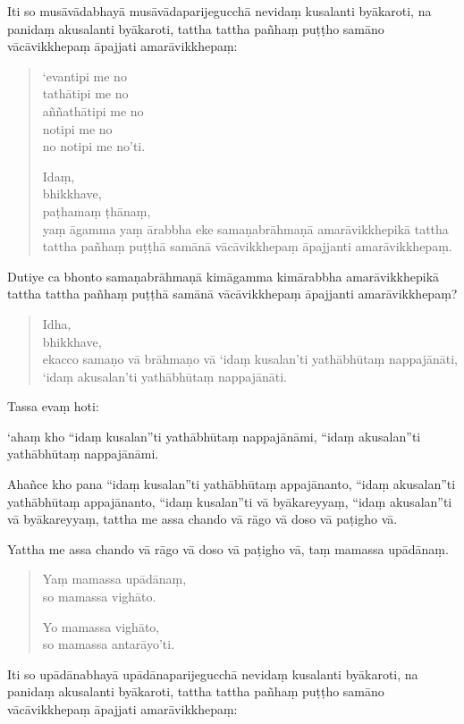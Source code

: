 \documentclass[11pt,twoside,openright]{book}
\begin{document}
\pstart
Iti so musāvādabhayā musāvādaparijegucchā nevidaṃ kusalanti byākaroti, na panidaṃ akusalanti byākaroti, tattha tattha pañhaṃ puṭṭho samāno vācāvikkhepaṃ āpajjati amarāvikkhepaṃ:
\pend

\begin{verse}
‘evantipi me no\\
 tathātipi me no\\
 aññathātipi me no\\
 notipi me no\\
 no notipi me no’ti.

Idaṃ,\\
\vin  bhikkhave,\\
\vin  paṭhamaṃ ṭhānaṃ,\\
\vin  yaṃ āgamma yaṃ ārabbha eke samaṇabrāhmaṇā amarāvikkhepikā tattha tattha pañhaṃ puṭṭhā samānā vācāvikkhepaṃ āpajjanti amarāvikkhepaṃ.

\end{verse}
\pstart
Dutiye ca bhonto samaṇabrāhmaṇā kimāgamma kimārabbha amarāvikkhepikā tattha tattha pañhaṃ puṭṭhā samānā vācāvikkhepaṃ āpajjanti amarāvikkhepaṃ?
\pend

\begin{verse}
Idha,\\
\vin  bhikkhave,\\
\vin  ekacco samaṇo vā brāhmaṇo vā ‘idaṃ kusalan’ti yathābhūtaṃ nappajānāti,\\
\vin  ‘idaṃ akusalan’ti yathābhūtaṃ nappajānāti.

\end{verse}
\pstart
Tassa evaṃ hoti:
\pend

\pstart
‘ahaṃ kho “idaṃ kusalan”ti yathābhūtaṃ nappajānāmi, “idaṃ akusalan”ti yathābhūtaṃ nappajānāmi.
\pend

\pstart
Ahañce kho pana “idaṃ kusalan”ti yathābhūtaṃ appajānanto, “idaṃ akusalan”ti yathābhūtaṃ appajānanto, “idaṃ kusalan”ti vā byākareyyaṃ, “idaṃ akusalan”ti vā byākareyyaṃ, tattha me assa chando vā rāgo vā doso vā paṭigho vā.
\pend

\pstart
Yattha me assa chando vā rāgo vā doso vā paṭigho vā, taṃ mamassa upādānaṃ.
\pend

\begin{verse}
Yaṃ mamassa upādānaṃ,\\
\vin  so mamassa vighāto.

Yo mamassa vighāto,\\
\vin  so mamassa antarāyo’ti.

\end{verse}
\pstart
Iti so upādānabhayā upādānaparijegucchā nevidaṃ kusalanti byākaroti, na panidaṃ akusalanti byākaroti, tattha tattha pañhaṃ puṭṭho samāno vācāvikkhepaṃ āpajjati amarāvikkhepaṃ:
\pend
\end{document}
